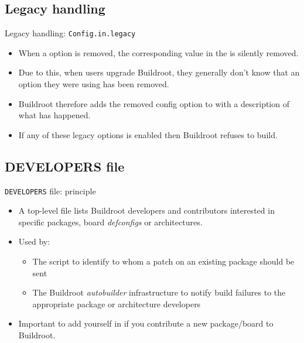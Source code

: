 \subsection{Legacy handling}

\begin{frame}{Legacy handling: {\tt Config.in.legacy}}
  \begin{itemize}
  \item When a  option is removed, the corresponding
    value in the  is silently removed.
  \item Due to this, when users upgrade Buildroot, they generally
    don't know that an option they were using has been removed.
  \item Buildroot therefore adds the removed config option to
     with a description of what has
    happened.
  \item If any of these legacy options is enabled then Buildroot
    refuses to build.
  \end{itemize}
\end{frame}

\subsection{DEVELOPERS file}

\begin{frame}{{\tt DEVELOPERS} file: principle}

  \begin{itemize}
  \item A top-level  file lists Buildroot developers
    and contributors interested in specific packages, board {\em
      defconfigs} or architectures.
  \item Used by:
    \begin{itemize}
    \item The  script to identify to whom a
      patch on an existing package should be sent
    \item The Buildroot {\em autobuilder} infrastructure to notify
      build failures to the appropriate package or architecture
      developers
    \end{itemize}
  \item Important to add yourself in  if you
    contribute a new package/board to Buildroot.
  \end{itemize}

\end{frame}

